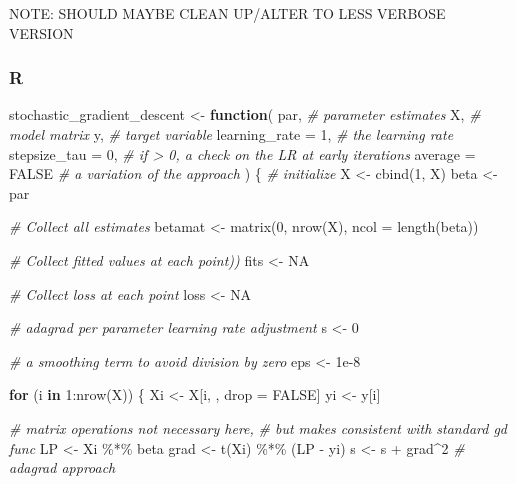 \documentclass[
  letterpaper,
]{krantz}
\newenvironment{Shaded}{}{}
\newcommand{\AttributeTok}[1]{\textcolor[rgb]{0.49,0.56,0.16}{#1}}
\newcommand{\CommentTok}[1]{\textcolor[rgb]{0.38,0.63,0.69}{\textit{#1}}}
\newcommand{\ConstantTok}[1]{\textcolor[rgb]{0.53,0.00,0.00}{#1}}
\newcommand{\ControlFlowTok}[1]{\textcolor[rgb]{0.00,0.44,0.13}{\textbf{#1}}}
\newcommand{\DecValTok}[1]{\textcolor[rgb]{0.25,0.63,0.44}{#1}}
\newcommand{\FloatTok}[1]{\textcolor[rgb]{0.25,0.63,0.44}{#1}}
\newcommand{\FunctionTok}[1]{\textcolor[rgb]{0.02,0.16,0.49}{#1}}
\newcommand{\NormalTok}[1]{#1}
\newcommand{\OtherTok}[1]{\textcolor[rgb]{0.00,0.44,0.13}{#1}}
\newcommand{\SpecialCharTok}[1]{\textcolor[rgb]{0.25,0.44,0.63}{#1}}
\begin{document}
NOTE: SHOULD MAYBE CLEAN UP/ALTER TO LESS VERBOSE VERSION

\subsubsection{R}

\begin{Shaded}
\begin{Highlighting}[]
\NormalTok{stochastic\_gradient\_descent }\OtherTok{\textless{}{-}} \ControlFlowTok{function}\NormalTok{(}
\NormalTok{    par, }\CommentTok{\# parameter estimates}
\NormalTok{    X, }\CommentTok{\# model matrix}
\NormalTok{    y, }\CommentTok{\# target variable}
    \AttributeTok{learning\_rate =} \DecValTok{1}\NormalTok{, }\CommentTok{\# the learning rate}
    \AttributeTok{stepsize\_tau =} \DecValTok{0}\NormalTok{, }\CommentTok{\# if \textgreater{} 0, a check on the LR at early iterations}
    \AttributeTok{average =} \ConstantTok{FALSE} \CommentTok{\# a variation of the approach}
\NormalTok{    ) \{}
    \CommentTok{\# initialize}
\NormalTok{    X }\OtherTok{\textless{}{-}} \FunctionTok{cbind}\NormalTok{(}\DecValTok{1}\NormalTok{, X)}
\NormalTok{    beta }\OtherTok{\textless{}{-}}\NormalTok{ par}

    \CommentTok{\# Collect all estimates}
\NormalTok{    betamat }\OtherTok{\textless{}{-}} \FunctionTok{matrix}\NormalTok{(}\DecValTok{0}\NormalTok{, }\FunctionTok{nrow}\NormalTok{(X), }\AttributeTok{ncol =} \FunctionTok{length}\NormalTok{(beta))}

    \CommentTok{\# Collect fitted values at each point))}
\NormalTok{    fits }\OtherTok{\textless{}{-}} \ConstantTok{NA}

    \CommentTok{\# Collect loss at each point}
\NormalTok{    loss }\OtherTok{\textless{}{-}} \ConstantTok{NA}

    \CommentTok{\# adagrad per parameter learning rate adjustment}
\NormalTok{    s }\OtherTok{\textless{}{-}} \DecValTok{0}

    \CommentTok{\# a smoothing term to avoid division by zero}
\NormalTok{    eps }\OtherTok{\textless{}{-}} \FloatTok{1e{-}8}

    \ControlFlowTok{for}\NormalTok{ (i }\ControlFlowTok{in} \DecValTok{1}\SpecialCharTok{:}\FunctionTok{nrow}\NormalTok{(X)) \{}
\NormalTok{        Xi }\OtherTok{\textless{}{-}}\NormalTok{ X[i, , drop }\OtherTok{=} \ConstantTok{FALSE}\NormalTok{]}
\NormalTok{        yi }\OtherTok{\textless{}{-}}\NormalTok{ y[i]}

        \CommentTok{\# matrix operations not necessary here,}
        \CommentTok{\# but makes consistent with standard gd func}
\NormalTok{        LP }\OtherTok{\textless{}{-}}\NormalTok{ Xi }\SpecialCharTok{\%*\%}\NormalTok{ beta}
\NormalTok{        grad }\OtherTok{\textless{}{-}} \FunctionTok{t}\NormalTok{(Xi) }\SpecialCharTok{\%*\%}\NormalTok{ (LP }\SpecialCharTok{{-}}\NormalTok{ yi)}
\NormalTok{        s }\OtherTok{\textless{}{-}}\NormalTok{ s }\SpecialCharTok{+}\NormalTok{ grad}\SpecialCharTok{\^{}}\DecValTok{2} \CommentTok{\# adagrad approach}


\end{Highlighting}
\end{Shaded}
\end{document}
